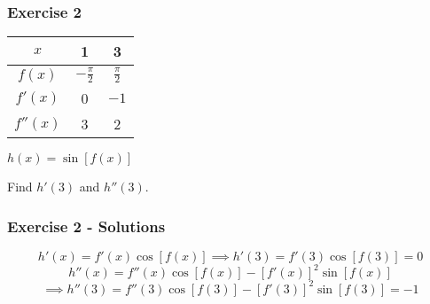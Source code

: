 \documentclass[12pt]{beamer}
\begin{document}
\begin{frame}
	\frametitle{Exercise 2}
	\vfill
	\vfill
	\begin{table}[]
		\begin{tabular}{|c||c|c|}\hline
			$x$      & 1            & 3           \\ \hline
			$f(x)$   & $-\frac\pi2$ & $\frac\pi2$ \\ \hline
			$f'(x)$  & 0            & $-1$        \\ \hline
			$f''(x)$ & 3            & 2           \\ \hline
		\end{tabular}\par
		\vfill
		$h(x)=\sin[f(x)]$\par
		\vfill
		\Large
		Find $h'(3)$ and $h''(3)$.
	\end{table}
	\vfill
\end{frame}
\begin{frame}
	\frametitle{Exercise 2 - Solutions}

	\[h'(x)=f'(x)\cos[f(x)]\implies \boxed{h'(3)=f'(3)\cos[f(3)]=0}\]
	\[h''(x)=f''(x)\cos[f(x)]-[f'(x)]^2\sin[f(x)]\]
	\[\implies \boxed{h''(3)=f''(3)\cos[f(3)]-[f'(3)]^2\sin[f(3)]=-1}\]
\end{frame}
\end{document}
